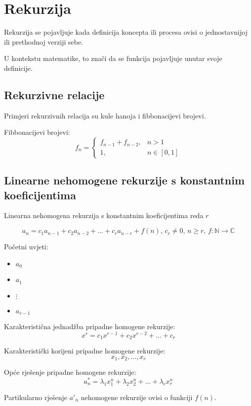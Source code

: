 \section{Rekurzija}

Rekurzija se pojavljuje kada definicija koncepta ili procesa ovisi o
jednostavnijoj ili prethodnoj verziji sebe.

U kontekstu matematike, to znači da se funkcija pojavljuje unutar svoje
definicije.

\subsection{Rekurzivne relacije}

Primjeri rekurzivnih relacija su kule hanoja i fibbonacijevi brojevi.

Fibbonacijevi brojevi:
$$
    f_n = \begin{cases}
        f_{n-1} + f_{n-2},& n > 1\\
        1,& n \in [0, 1]
    \end{cases}
$$

\subsection{Linearne nehomogene rekurzije s konstantnim koeficijentima}

Linearna nehomogena rekurzija s konstantnim koeficijentima reda $r$

$$
    a_n = c_1a_{n-1}+c_2a_{n-2}+\dots+c_ra_{n-r}+f(n),\, c_r \neq 0,\, n \geq r,\, f: \mathbb{N} \to \mathbb{C}
$$

Početni uvjeti:

\begin{itemize}
    \item $a_0$
    \item $a_1$
    \item $\vdots$
    \item $a_{r-1}$
\end{itemize}

Karakteristična jednadžba pripadne homogene rekurzije:
$$
x^r = c_1x^{r-1}+c_2x^{r-2}+\dots+c_r
$$

Karakteristički korijeni pripadne homogene rekurzije:
$$
x_1,x_2,\dots,x_r
$$

Opće rješenje pripadne homogene rekurzije:
$$
a_n^* = \lambda_1x_1^n+\lambda_2x_2^n+\dots+\lambda_rx_r^n
$$

Partikularno rješenje $a'_n$ nehomogene rekurzije ovisi o funkciji $f(n)$.

